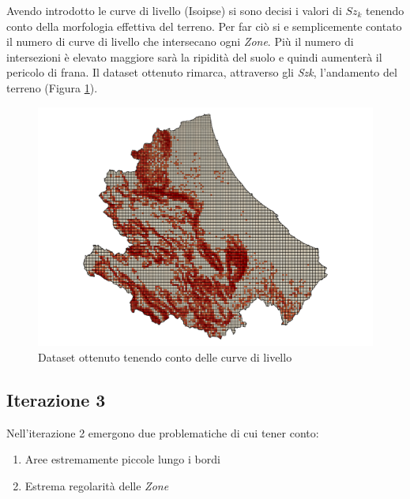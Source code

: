 Avendo introdotto le curve di livello (Isoipse) si sono decisi i valori di $Sz_k$ tenendo conto della morfologia effettiva del terreno. 
Per far ciò si e semplicemente contato il numero di curve di livello che intersecano ogni \textit{Zone}. Più il numero di intersezioni è elevato maggiore sarà la ripidità del suolo e quindi aumenterà il pericolo di frana. Il dataset ottenuto rimarca, attraverso gli \textit{Szk}, l'andamento del terreno (Figura \ref{fig:dataset_it_2}).

\begin{figure}[H]
	\centering
	\includegraphics[width=1\textwidth]{images/abruzzoZKquadretto.png}
	\caption{Dataset ottenuto tenendo conto delle curve di livello}
	\label{fig:dataset_it_2}
\end{figure}


\subsection{\textbf{Iterazione 3}}

Nell'iterazione 2 emergono due problematiche di cui tener conto:

\begin{enumerate}
	\item Aree estremamente piccole lungo i bordi
	\item Estrema regolarità delle \textit{Zone}
\end{enumerate}

